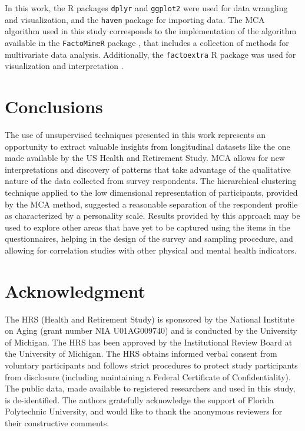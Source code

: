 \documentclass[conference]{IEEEtran}
\begin{document}
In this work, the R packages \texttt{dplyr} \cite{Refdplyr} and
\texttt{ggplot2} \cite{ggplotBook} were used for data wrangling and
visualization, and the \texttt{haven} package \cite{wickham2018haven}
for importing data. The MCA algorithm used in this study corresponds to
the implementation of the algorithm available in the \texttt{FactoMineR}
package \cite{le2008factominer}, that includes a collection of methods
for multivariate data analysis. Additionally, the \texttt{factoextra} R
package was used for visualization and interpretation \cite{factoextra}.

\hypertarget{conclusions}{%
\section{Conclusions}\label{conclusions}}

The use of unsupervised techniques presented in this work represents an
opportunity to extract valuable insights from longitudinal datasets like
the one made available by the US Health and Retirement Study. MCA allows
for new interpretations and discovery of patterns that take advantage of
the qualitative nature of the data collected from survey respondents.
The hierarchical clustering technique applied to the low dimensional
representation of participants, provided by the MCA method, suggested a
reasonable separation of the respondent profile as characterized by a
personality scale. Results provided by this approach may be used to
explore other areas that have yet to be captured using the items in the
questionnaires, helping in the design of the survey and sampling
procedure, and allowing for correlation studies with other physical and
mental health indicators.

\hypertarget{acknowledgment}{%
\section*{Acknowledgment}\label{acknowledgment}}

The HRS (Health and Retirement Study) is sponsored by the National
Institute on Aging (grant number NIA U01AG009740) and is conducted by
the University of Michigan. The HRS has been approved by the
Institutional Review Board at the University of Michigan. The HRS
obtains informed verbal consent from voluntary participants and follows
strict procedures to protect study participants from disclosure
(including maintaining a Federal Certificate of Confidentiality). The
public data, made available to registered researchers and used in this
study, is de-identified. The authors gratefully acknowledge the support
of Florida Polytechnic University, and would like to thank the anonymous
reviewers for their constructive comments.




\end{document}
